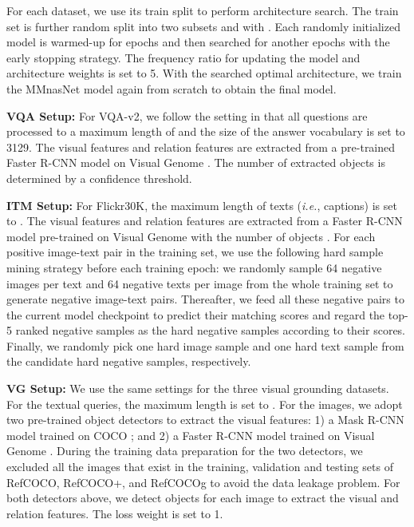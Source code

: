\documentclass[sigconf]{acmart}
\begin{document}
For each dataset, we use its train split to perform architecture search. The train set is further random split into two subsets  and  with . Each randomly initialized model is warmed-up for  epochs and then searched for another  epochs with the early stopping strategy.
The frequency ratio  for updating the model and architecture weights is set to 5. With the searched optimal architecture, we train the MMnasNet model again from scratch to obtain the final model.


\noindent\textbf{VQA Setup:} For VQA-v2, we follow the setting in \cite{yu2019mcan} that all questions are processed to a maximum length of  and the size of the answer vocabulary is set to 3129.  The visual features and relation features are extracted from a pre-trained Faster R-CNN model on Visual Genome \cite{anderson2017up-down}. The number of extracted objects  is determined by a confidence threshold.


\noindent\textbf{ITM Setup:} For Flickr30K, the maximum length of texts (\emph{i.e.}, captions) is set to . The visual features and relation features are extracted from a Faster R-CNN model pre-trained on Visual Genome with the number of objects  \cite{anderson2017up-down}. For each positive image-text pair  in the training set, we use the following hard sample mining strategy before each training epoch: we randomly sample 64 negative images per text and 64 negative texts per image from the whole training set to generate negative image-text pairs. Thereafter, we feed all these negative pairs to the current model checkpoint to predict their matching scores and regard the top-5 ranked negative samples as the hard negative samples according to their scores. Finally, we randomly pick one hard image sample  and one hard text sample  from the candidate hard negative samples, respectively.

\noindent\textbf{VG Setup:} We use the same settings for the three visual grounding datasets. For the textual queries, the maximum length is set to . For the images, we adopt two pre-trained object detectors to extract the visual features: 1) a Mask R-CNN model trained on COCO \cite{he2017mask}; and 2) a Faster R-CNN model trained on Visual Genome \cite{ren2015faster}. During the training data preparation for the two detectors, we excluded all the images that exist in the training, validation and testing sets of RefCOCO, RefCOCO+, and RefCOCOg to avoid the data leakage problem. For both detectors above, we detect  objects for each image to extract the visual and relation features. The loss weight  is set to 1.
\end{document}
